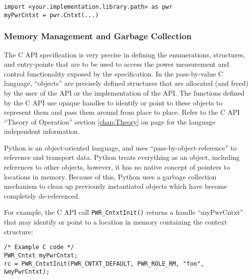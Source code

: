 \begin{center}\begin{minipage}{.95\linewidth}\begin{lstlisting}
import <your.implementation.library.path> as pwr
myPwrCntxt = pwr.Cntxt(...)
\end{lstlisting}\end{minipage}\end{center}

\subsubsection{Memory Management and Garbage Collection}\label{sec:PythonMemoryManagement}

The C API specification is very precise in defining the enumerations,
structures, and entry-points that are to be used to access the power
measurement and control functionality exposed by the specification. In the
pass-by-value C language, ``objects'' are precisely defined structures that are
allocated (and freed) by the user of the API or the implementation of the API.
The functions defined by the C API use opaque handles to identify or point to
these objects to represent
them and pass them around from place to place. Refer to the C API ``Theory of
Operation'' section \ref{chap:Theory} on page \pageref{chap:Theory} for the
language independent information.

Python is an object-oriented language, and uses ``pass-by-object-reference'' to
reference and transport data. Python treats everything as an object, including
references to other objects, however, it has no native concept of pointers to
locations in memory. Because of this, Python uses a garbage collection
mechanism to clean up previously instantiated objects which have become
completely de-referenced.

For example, the C API call \texttt{PWR_CntxtInit()} returns a handle
``myPwrCntxt'' that may identify or point to a location in memory containing
the context structure:

\begin{center}\begin{minipage}{.95\linewidth}\begin{lstlisting}
/* Example C code */
PWR_Cntxt myPwrCntxt;
rc = PWR_CntxtInit(PWR_CNTXT_DEFAULT, PWR_ROLE_RM, "foo", &myPwrCntxt);
\end{lstlisting}\end{minipage}\end{center}

